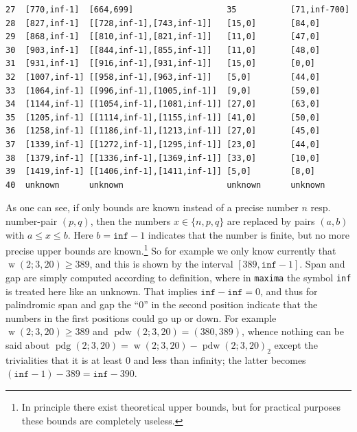 \documentclass[final,3p,times]{elsarticle}
\theoremstyle{definition}
\newcommand{\set}[1]{\{#1\}}
\renewcommand{\leq}{\le} %
\DeclareMathOperator{\vdw}{w}
\DeclareMathOperator{\vdwpd}{pdw}
\DeclareMathOperator{\pdg}{pdg}
\begin{document}
\begin{appendix}
\begin{verbatim}
27  [770,inf-1]  [664,699]                   35           [71,inf-700]
28  [827,inf-1]  [[728,inf-1],[743,inf-1]]   [15,0]       [84,0]
29  [868,inf-1]  [[810,inf-1],[821,inf-1]]   [11,0]       [47,0]
30  [903,inf-1]  [[844,inf-1],[855,inf-1]]   [11,0]       [48,0]
31  [931,inf-1]  [[916,inf-1],[931,inf-1]]   [15,0]       [0,0]
32  [1007,inf-1] [[958,inf-1],[963,inf-1]]   [5,0]        [44,0]
33  [1064,inf-1] [[996,inf-1],[1005,inf-1]]  [9,0]        [59,0]
34  [1144,inf-1] [[1054,inf-1],[1081,inf-1]] [27,0]       [63,0]
35  [1205,inf-1] [[1114,inf-1],[1155,inf-1]] [41,0]       [50,0]
36  [1258,inf-1] [[1186,inf-1],[1213,inf-1]] [27,0]       [45,0]
37  [1339,inf-1] [[1272,inf-1],[1295,inf-1]] [23,0]       [44,0]
38  [1379,inf-1] [[1336,inf-1],[1369,inf-1]] [33,0]       [10,0]
39  [1419,inf-1] [[1406,inf-1],[1411,inf-1]] [5,0]        [8,0]
40  unknown      unknown                     unknown      unknown
\end{verbatim}
As one can see, if only bounds are known instead of a precise number $n$ resp. number-pair $(p,q)$, then the numbers $x \in \set{n,p,q}$ are replaced by pairs $(a,b)$ with $a \leq x \leq b$. Here $b = \mathtt{inf} - 1$ indicates that the number is finite, but no more precise upper bounds are known.\footnote{In principle there exist theoretical upper bounds, but for practical purposes these bounds are completely useless.} So for example we only know currently that $\vdw(2;3,20) \geq 389$, and this is shown by the interval $[389, \mathtt{inf}-1]$. Span and gap are simply computed according to definition, where in \texttt{maxima} the symbol \texttt{inf} is treated here like an unknown. That implies $\mathtt{inf} - \mathtt{inf} = 0$, and thus for palindromic span and gap the ``0'' in the second position indicate that the numbers in the first positions could go up or down. For example $\vdw(2;3,20) \geq 389$ and $\vdwpd(2;3,20) = (380,389)$, whence nothing can be said about $\pdg(2;3,20) = \vdw(2;3,20) - \vdwpd(2;3,20)_2$ except the trivialities that it is at least $0$ and less than infinity; the latter becomes $(\mathtt{inf} - 1) - 389 =  \mathtt{inf} - 390$.


\end{appendix}
\end{document}

